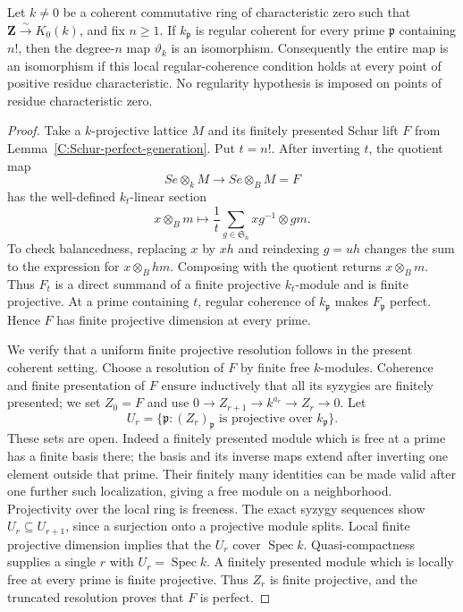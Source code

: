 \begin{theorem}
\label{C:coherent-regular-modular-locus}
Let $k\ne0$ be a coherent commutative ring of characteristic zero
such that $\mathbf Z\xrightarrow{\sim}K_0(k)$, and fix $n\geq1$.
If $k_{\mathfrak p}$ is regular coherent for every prime
$\mathfrak p$ containing $n!$, then the degree-$n$ map
$\vartheta_k$ is an isomorphism.
Consequently the entire map is an isomorphism if this local
regular-coherence condition holds at every point of positive
residue characteristic.  No regularity hypothesis is imposed
on points of residue characteristic zero.
\end{theorem}
\begin{proof}
Take a $k$-projective lattice $M$ and its finitely presented
Schur lift $F$ from Lemma~\ref{C:Schur-perfect-generation}.
Put $t=n!$.
After inverting $t$, the quotient map
\[
 Se\otimes_k M\longrightarrow Se\otimes_B M=F
\]
has the well-defined $k_t$-linear section
\[
 x\otimes_B m\longmapsto
       \frac1t\sum_{g\in\mathfrak S_n}xg^{-1}\otimes gm.
                                                               \tag{C.1.RC6}
\]
To check balancedness, replacing $x$ by $xh$ and
reindexing $g=uh$ changes the sum to the expression for
$x\otimes_B hm$.  Composing with the quotient returns
$x\otimes_B m$.  Thus $F_t$ is a direct summand of a finite
projective $k_t$-module and is finite projective.
At a prime containing $t$, regular coherence of
$k_{\mathfrak p}$ makes $F_{\mathfrak p}$ perfect.
Hence $F$ has finite projective dimension at every prime.

We verify that a uniform finite projective resolution follows
in the present coherent setting.
Choose a resolution of $F$ by finite free $k$-modules.
Coherence and finite presentation of $F$ ensure inductively
that all its syzygies are finitely presented; we set $Z_0=F$
and use $0\to Z_{r+1}\to k^{a_r}\to Z_r\to0$.
Let
\[
 U_r=\{\mathfrak p:(Z_r)_{\mathfrak p}
                       \text{ is projective over }k_{\mathfrak p}\}.
\]
These sets are open.  Indeed a finitely presented module
which is free at a prime has a finite basis there; the
basis and its inverse maps extend after inverting one
element outside that prime.  Their finitely many
identities can be made valid after one further such
localization, giving a free module on a neighborhood.
Projectivity over the local ring is freeness.
The exact syzygy sequences show $U_r\subseteq U_{r+1}$,
since a surjection onto a projective module splits.
Local finite projective dimension implies that the $U_r$
cover $\operatorname{Spec}k$.
Quasi-compactness supplies a single $r$ with
$U_r=\operatorname{Spec}k$.
A finitely presented module which is locally free at every
prime is finite projective.  Thus $Z_r$ is finite projective,
and the truncated resolution proves that $F$ is perfect.


\end{proof}
